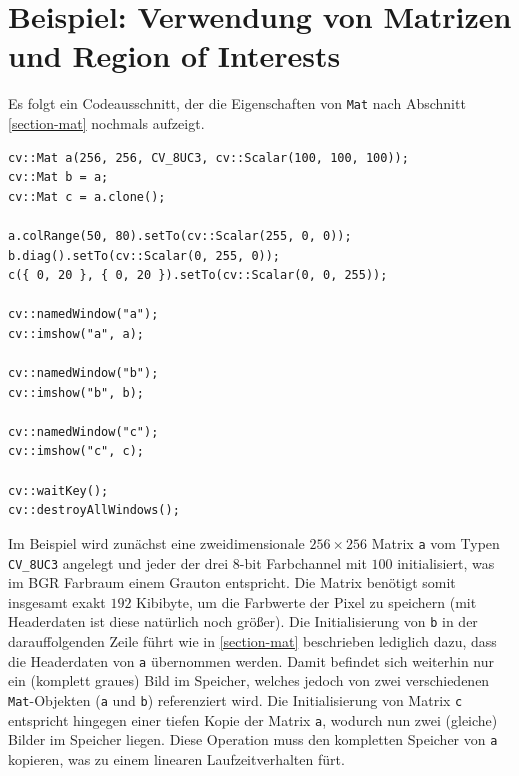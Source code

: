 \documentclass{whswinvcbook}
\begin{document}
\section{Beispiel: Verwendung von Matrizen und Region of Interests}
Es folgt ein Codeausschnitt, der die Eigenschaften von \texttt{Mat} nach Abschnitt \ref{section-mat} nochmals aufzeigt.
\begin{lstlisting}[caption=Verwendung von Mat und ROI, label=lst-mat-example]
cv::Mat a(256, 256, CV_8UC3, cv::Scalar(100, 100, 100));
cv::Mat b = a;
cv::Mat c = a.clone();

a.colRange(50, 80).setTo(cv::Scalar(255, 0, 0));
b.diag().setTo(cv::Scalar(0, 255, 0));
c({ 0, 20 }, { 0, 20 }).setTo(cv::Scalar(0, 0, 255));

cv::namedWindow("a");
cv::imshow("a", a);

cv::namedWindow("b");
cv::imshow("b", b);

cv::namedWindow("c");
cv::imshow("c", c);

cv::waitKey();
cv::destroyAllWindows();
\end{lstlisting}
Im Beispiel wird zunächst eine zweidimensionale $256\times256$ Matrix \texttt{a} vom Typen \texttt{CV\_8UC3} angelegt und jeder der drei 8-bit Farbchannel mit $100$ initialisiert, was im BGR Farbraum einem Grauton entspricht. Die Matrix benötigt somit insgesamt exakt $192$ Kibibyte, um die Farbwerte der Pixel zu speichern (mit Headerdaten ist diese natürlich noch größer). Die Initialisierung von \texttt{b} in der darauffolgenden Zeile führt wie in \ref{section-mat} beschrieben lediglich dazu, dass die Headerdaten von \texttt{a} übernommen werden. Damit befindet sich weiterhin nur ein (komplett graues) Bild im Speicher, welches jedoch von zwei verschiedenen \texttt{Mat}-Objekten (\texttt{a} und \texttt{b}) referenziert wird. Die Initialisierung von Matrix \texttt{c} entspricht hingegen einer tiefen Kopie der Matrix \texttt{a}, wodurch nun zwei (gleiche) Bilder im Speicher liegen. Diese Operation muss den kompletten Speicher von \texttt{a} kopieren, was zu einem linearen Laufzeitverhalten fürt.
\end{document}
